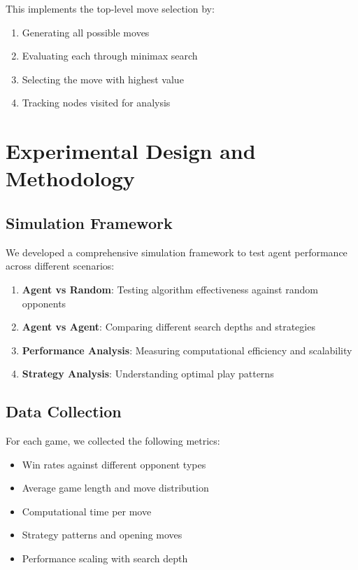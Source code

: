 \documentclass[12pt]{article}
\begin{document}
This implements the top-level move selection by:
\begin{enumerate}
    \item Generating all possible moves
    \item Evaluating each through minimax search
    \item Selecting the move with highest value
    \item Tracking nodes visited for analysis
\end{enumerate}

\section{Experimental Design and Methodology}

\subsection{Simulation Framework}

We developed a comprehensive simulation framework to test agent performance across different scenarios:

\begin{enumerate}
    \item \textbf{Agent vs Random}: Testing algorithm effectiveness against random opponents
\item \textbf{Agent vs Agent}: Comparing different search depths and strategies
    \item \textbf{Performance Analysis}: Measuring computational efficiency and scalability
    \item \textbf{Strategy Analysis}: Understanding optimal play patterns
\end{enumerate}

\subsection{Data Collection}

For each game, we collected the following metrics:
\begin{itemize}
    \item Win rates against different opponent types
    \item Average game length and move distribution
    \item Computational time per move
    \item Strategy patterns and opening moves
    \item Performance scaling with search depth
\end{itemize}
\end{document}
